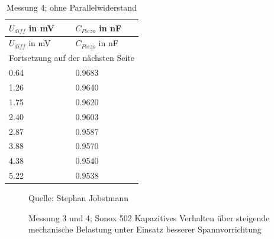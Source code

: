\documentclass[12pt]{scrreprt} %
\begin{document}
\setlongtables
\begin{longtable}{| l | l |}
\caption{Messung 4; ohne Parallelwiderstand}\\
\hline
$U_{diff}$ in mV&$C_{Piezo}$ in nF\\
\hline
\endfirsthead
\hline
$U_{diff}$ in mV&$C_{Piezo}$ in nF\\
\hline
\endhead
\hline
\multicolumn{2}{|c|}{Fortsetzung auf der nächsten Seite}\\
\hline
\endfoot
\hline \hline
\endlastfoot
\hline
\label{tab:2.4}%
0.64&0.9683\\
1.26&0.9640\\
1.75&0.9620\\
2.40&0.9603\\
2.87&0.9587\\
3.88&0.9570\\
4.38&0.9540\\
5.22&0.9538\\
\end{longtable}

\begin {figure}[htbp]
\caption[Messung 3 und 4; Sonox 502 unter Einsatz besserer Spannvorrichtung]{Messung 3 und 4; Sonox 502 Kapazitives Verhalten über steigende mechanische Belastung unter Einsatz besserer Spannvorrichtung}
      \begin{center}
      \end{center}
Quelle: Stephan Jobstmann
\label{fig:2.3}
\end{figure}
\newpage
\end{document}
